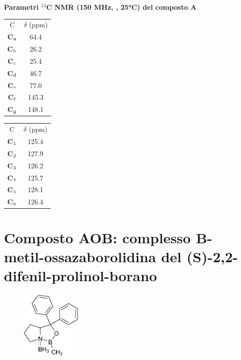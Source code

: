 \documentclass[a4paper, italian, oneside, 12pt]{article}
\begin{document}
{%
\begin{table}[hb]\begin{center}
 {\bf{Parametri $^{13}$C NMR (150 MHz, , 25°C) del composto A}}\end{center}

\begin{multicols}{2}
\begin{center}
\begin{tabular}{c|c}
\toprule
C & $\delta $ (ppm)\\\cmidrule(r){1-1}\cmidrule(l){2-2}
{\bf{C$_{\textrm a}$}} & 64.4\\
{\bf{C$_{\textrm b}$}} & 26.2\\
{\bf{C$_{\textrm c}$}} & 25.4\\
{\bf{C$_{\textrm d}$}} & 46.7\\
{\bf{C$_{\textrm e}$}} & 77.0\\
{\bf{C$_{\textrm f}$}} & 145.3\\
{\bf{C$_{\textrm g}$}} & 148.1\\\bottomrule
\end{tabular}
\end{center}
\columnbreak
\begin{center}
\begin{tabular}{c|c}
\toprule
C & $\delta $ (ppm)\\\cmidrule(r){1-1}\cmidrule(l){2-2}
{\bf{C$_{\textrm 1}$}} & 125.4\\
{\bf{C$_{\textrm 2}$}} & 127.9\\
{\bf{C$_{\textrm 3}$}} & 126.2\\
{\bf{C$_{\textrm 4}$}} & 125.7\\
{\bf{C$_{\textrm 5}$}} & 128.1\\
{\bf{C$_{\textrm 6}$}} & 126.4\\\bottomrule
\end{tabular}
\end{center}
\end{multicols}
\end{table}}

\clearpage


\section{Composto AOB: complesso B-metil-ossazaborolidina del (S)-2,2-difenil-prolinol-borano}

\begin{figure}\vspace{-20pt}
  \begin{center}
    \includegraphics[width=0.27\textwidth]{img/AOB1.png}
  \end{center}\vspace{-20pt}
\end{figure}
\end{document}
